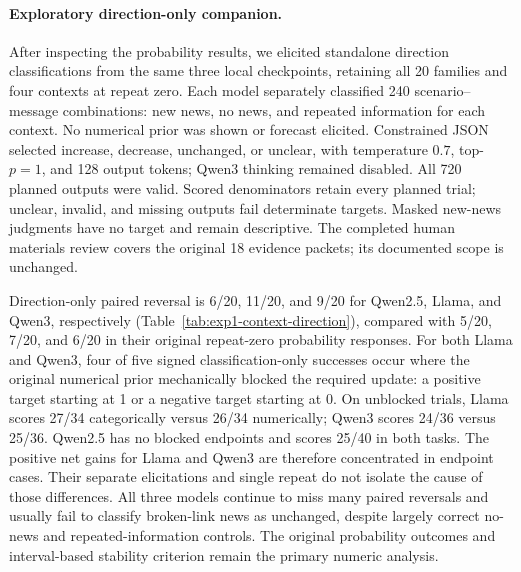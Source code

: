 \paragraph{Exploratory direction-only companion.}
After inspecting the probability results, we elicited standalone direction
classifications from the same three local checkpoints, retaining all 20
families and four contexts at repeat zero. Each model separately classified 240
scenario--message combinations: new news, no news, and repeated information for
each context. No numerical prior was shown or forecast elicited. Constrained
JSON selected increase, decrease, unchanged, or unclear, with temperature $0.7$,
top-$p=1$, and 128 output tokens; Qwen3 thinking remained disabled. All 720
planned outputs were valid. Scored denominators retain every planned trial;
unclear, invalid, and missing outputs fail determinate targets. Masked new-news
judgments have no target and remain descriptive. The completed human materials
review covers the original 18 evidence packets; its documented scope is unchanged.

\begin{center}
\begin{minipage}{\linewidth}
\centering
{}
\label{tab:exp1-context-direction}
\small

\end{minipage}
\end{center}

Direction-only paired reversal is 6/20, 11/20, and 9/20 for Qwen2.5, Llama,
and Qwen3, respectively (Table~\ref{tab:exp1-context-direction}), compared with
5/20, 7/20, and 6/20 in their original repeat-zero probability responses.
For both Llama and Qwen3, four of five signed classification-only successes
occur where the original numerical prior mechanically blocked the required
update: a positive target starting at 1 or a negative target starting at 0.
On unblocked trials, Llama scores 27/34 categorically versus 26/34 numerically;
Qwen3 scores 24/36 versus 25/36. Qwen2.5 has no blocked endpoints and scores
25/40 in both tasks. The positive net gains for Llama and Qwen3 are therefore
concentrated in endpoint cases. Their separate elicitations and single repeat
do not isolate the cause of those differences. All three models continue to
miss many paired reversals and usually fail to classify broken-link news as
unchanged, despite largely correct no-news and repeated-information controls.
The original probability outcomes and interval-based stability criterion remain
the primary numeric analysis.

